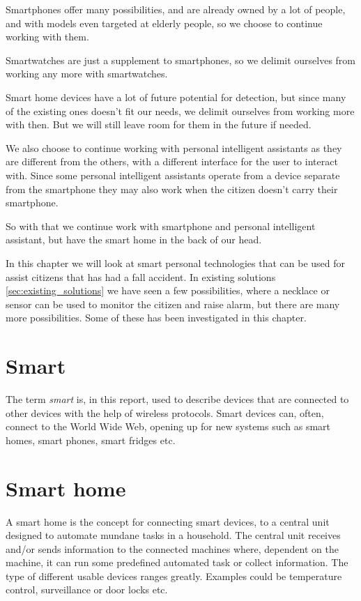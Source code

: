 Smartphones offer many possibilities, and are already owned by a lot of people, and with models even targeted at elderly people, so we choose to continue working with them.

Smartwatches are just a supplement to smartphones, so we delimit ourselves from working any more with smartwatches.

Smart home devices have a lot of future potential for detection, but since many of the existing ones doesn't fit our needs, we delimit ourselves from working more with then. But we will still leave room for them in the future if needed.

We also choose to continue working with personal intelligent assistants as they are different from the others, with a different interface for the user to interact with. Since some personal intelligent assistants operate from a device separate from the smartphone they may also work when the citizen doesn't carry their smartphone.

So with that we continue work with smartphone and personal intelligent assistant, but have the smart home in the back of our head.

\iffalse
In this chapter we will look at smart personal technologies that can be used for assist citizens that has had a fall accident. In existing solutions \ref{sec:existing_solutions} we have seen a few possibilities, where a necklace or sensor can be used to monitor the citizen and raise alarm, but there are many more possibilities. Some of these has been investigated in this chapter.


\section*{Smart}
The term \textit{smart} is, in this report, used to describe devices that are connected to other devices with the help of wireless protocols. Smart devices can, often, connect to the World Wide Web, opening up for new systems such as smart homes, smart phones, smart fridges etc. 

\section*{Smart home}
A smart home is the concept for connecting smart devices, to a central unit designed to automate mundane tasks in a household. The central unit receives and/or sends information to the connected machines where, dependent on the machine, it can run some predefined automated task or collect information. The type of different usable devices ranges greatly. Examples could be temperature control, surveillance or door locks etc.


